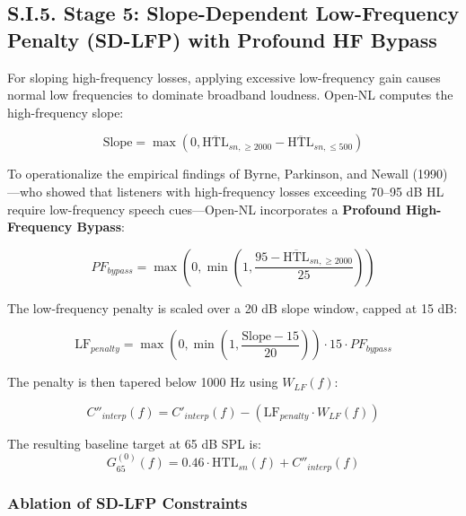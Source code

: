 \documentclass[
  12pt,
]{article}
\begin{document}
\subsection{S.I.5. Stage 5: Slope-Dependent Low-Frequency Penalty
(SD-LFP) with Profound HF
Bypass}\label{s.i.5.-stage-5-slope-dependent-low-frequency-penalty-sd-lfp-with-profound-hf-bypass}

For sloping high-frequency losses, applying excessive low-frequency gain
causes normal low frequencies to dominate broadband loudness. Open-NL
computes the high-frequency slope:

\begin{equation}
\text{Slope} = \max\left(0, \overline{\text{HTL}}_{sn, \ge 2000} - \overline{\text{HTL}}_{sn, \le 500}\right)
\end{equation}

To operationalize the empirical findings of Byrne, Parkinson, and Newall
(1990)---who showed that listeners with high-frequency losses exceeding
70--95 dB HL require low-frequency speech cues---Open-NL incorporates a
\textbf{Profound High-Frequency Bypass}:

\begin{equation}
PF_{bypass} = \max\left(0, \min\left(1, \frac{95 - \overline{\text{HTL}}_{sn, \ge 2000}}{25}\right)\right)
\end{equation}

The low-frequency penalty is scaled over a 20 dB slope window, capped at
15 dB:

\begin{equation}
\text{LF}_{penalty} = \max\left(0, \min\left(1, \frac{\text{Slope} - 15}{20}\right)\right) \cdot 15 \cdot PF_{bypass}
\end{equation}

The penalty is then tapered below 1000 Hz using \(W_{LF}(f)\):

\begin{equation}
C''_{interp}(f) = C'_{interp}(f) - \left(\text{LF}_{penalty} \cdot W_{LF}(f)\right)
\end{equation}

The resulting baseline target at 65 dB SPL is: \begin{equation}
G_{65}^{(0)}(f) = 0.46 \cdot \text{HTL}_{sn}(f) + C''_{interp}(f)
\end{equation}

\subsubsection{Ablation of SD-LFP
Constraints}\label{ablation-of-sd-lfp-constraints}
\end{document}

